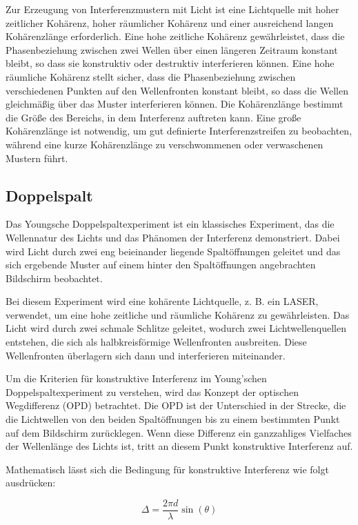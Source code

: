 \documentclass[12pt,english,ngerman]{scrartcl}
\begin{document}
Zur Erzeugung von Interferenzmustern mit Licht ist eine Lichtquelle mit hoher
zeitlicher Kohärenz, hoher räumlicher Kohärenz und einer ausreichend langen
Kohärenzlänge erforderlich. Eine hohe zeitliche Kohärenz gewährleistet, dass
die Phasenbeziehung zwischen zwei Wellen über einen längeren Zeitraum konstant
bleibt, so dass sie konstruktiv oder destruktiv interferieren können. Eine hohe
räumliche Kohärenz stellt sicher, dass die Phasenbeziehung zwischen
verschiedenen Punkten auf den Wellenfronten konstant bleibt, so dass die Wellen
gleichmäßig über das Muster interferieren können. Die Kohärenzlänge bestimmt
die Größe des Bereichs, in dem Interferenz auftreten kann. Eine große
Kohärenzlänge ist notwendig, um gut definierte Interferenzstreifen zu
beobachten, während eine kurze Kohärenzlänge zu verschwommenen oder
verwaschenen Mustern führt.

\subsection{Doppelspalt}

Das Youngsche Doppelspaltexperiment ist ein klassisches Experiment, das die
Wellennatur des Lichts und das Phänomen der Interferenz demonstriert. Dabei
wird Licht durch zwei eng beieinander liegende Spaltöffnungen geleitet und das
sich ergebende Muster auf einem hinter den Spaltöffnungen angebrachten
Bildschirm beobachtet.

Bei diesem Experiment wird eine kohärente Lichtquelle, z. B. ein LASER,
verwendet, um eine hohe zeitliche und räumliche Kohärenz zu gewährleisten. Das
Licht wird durch zwei schmale Schlitze geleitet, wodurch zwei
Lichtwellenquellen entstehen, die sich als halbkreisförmige Wellenfronten
ausbreiten. Diese Wellenfronten überlagern sich dann und interferieren
miteinander.

Um die Kriterien für konstruktive Interferenz im Young'schen
Doppelspaltexperiment zu verstehen, wird das Konzept der optischen Wegdifferenz
(OPD) betrachtet. Die OPD ist der Unterschied in der Strecke, die die
Lichtwellen von den beiden Spaltöffnungen bis zu einem bestimmten Punkt auf dem
Bildschirm zurücklegen. Wenn diese Differenz ein ganzzahliges Vielfaches der
Wellenlänge des Lichts ist, tritt an diesem Punkt konstruktive Interferenz auf.

Mathematisch lässt sich die Bedingung für konstruktive Interferenz wie folgt
ausdrücken:

\begin{equation}
	\Delta = \frac{2\pi d}{\lambda}\sin(\theta)
	\label{eq:konstruktiveInterferenz}
\end{equation}
\end{document}
